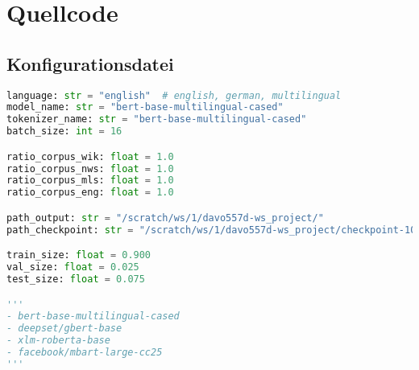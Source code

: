 \chapter*{Quellcode}

\section*{Konfigurationsdatei}
\begin{lstlisting}[language=Python, caption=Konfigurationsdatei]
language: str = "english"  # english, german, multilingual
model_name: str = "bert-base-multilingual-cased"
tokenizer_name: str = "bert-base-multilingual-cased"
batch_size: int = 16

ratio_corpus_wik: float = 1.0
ratio_corpus_nws: float = 1.0
ratio_corpus_mls: float = 1.0
ratio_corpus_eng: float = 1.0

path_output: str = "/scratch/ws/1/davo557d-ws_project/"
path_checkpoint: str = "/scratch/ws/1/davo557d-ws_project/checkpoint-100000"

train_size: float = 0.900
val_size: float = 0.025
test_size: float = 0.075

'''
- bert-base-multilingual-cased
- deepset/gbert-base
- xlm-roberta-base
- facebook/mbart-large-cc25
'''
\end{lstlisting}
\newpage


